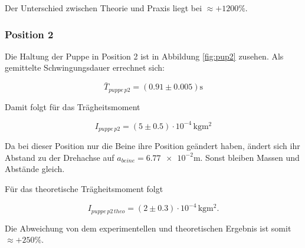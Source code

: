 Der Unterschied zwischen Theorie und Praxis liegt bei $\approx +1200 \%$. %

\subsubsection{Position 2}
Die Haltung der Puppe in Position 2 ist in Abbildung \ref{fig:pup2} zusehen.
Als gemittelte Schwingungsdauer errechnet sich:

\begin{equation*}
\bar{T}_{puppe\, p2}=\left(\num{0.91}\pm\num{0.005}\right) \si{\second}
\end{equation*}

Damit folgt für das Trägheitsmoment

\begin{equation}
\label{eq:traeg_puppe_p2}
I_{puppe \,p2}= \left(\num{5}\pm\num{0.5}\right)\cdot 10^{-4}\,\si{\kilogram\meter\squared}
\end{equation}

Da bei dieser Position nur die Beine ihre Position geändert haben, ändert
sich ihr Abstand zu der Drehachse auf $a_{beine}=\num{6.77e-2}\si{\meter}$.
Sonst bleiben Massen und Abstände gleich.

Für das theoretische Trägheitsmoment folgt

\begin{equation*}
I_{puppe\, p2\,theo}=\left(\num{2}\pm\num{0.3}\right)\cdot 10^{-4} \,\si{\kilogram\meter\squared}.
\end{equation*}

Die Abweichung von dem experimentellen und theoretischen Ergebnis ist
somit $\approx +250 \%$. %

